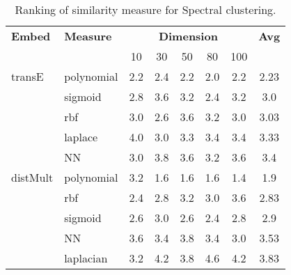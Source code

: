 \begin{table}
	\caption{Ranking of similarity measure for Spectral clustering.}
		\label{tab:ranksSpectral}
		\begin{tabular}{@{}llcccccc@{}}
				\toprule
				\textbf{Embed}		& \textbf{Measure}	& \multicolumn{5}{c}{\textbf{Dimension}}	& \textbf{Avg} \\
								\cmidrule(lr){3-7}
								&					&  10	& 30		& 50	& 80 	& 100		&				\\
								\midrule
				transE			& polynomial			& 2.2	& 2.4	& 2.2	& 2.0	& 2.2		& 2.23			\\
								& sigmoid			& 2.8	& 3.6	& 3.2	& 2.4	& 3.2		& 3.0    \\
								& rbf				& 3.0	& 2.6	& 3.6	& 3.2	& 3.0		& 3.03		\\
								& laplace			& 4.0	& 3.0	& 3.3	& 3.4	& 3.4		& 3.33			\\
								& NN				& 3.0	& 3.8	& 3.6	& 3.2	& 3.6		& 3.4		\\
				distMult			& polynomial			& 3.2	& 1.6	& 1.6	& 1.6	& 1.4		& 1.9		\\
								& rbf				& 2.4	& 2.8	& 3.2	& 3.0	& 3.6		& 2.83        \\
								& sigmoid			& 2.6	& 3.0	& 2.6	& 2.4	& 2.8		& 2.9			\\
								& NN				& 3.6	& 3.4	& 3.8	& 3.4	& 3.0		& 3.53				\\
								& laplacian			& 3.2	& 4.2	& 3.8	& 4.6	& 4.2		& 3.83				\\
				\bottomrule	
				
			\end{tabular}
\end{table}
	
